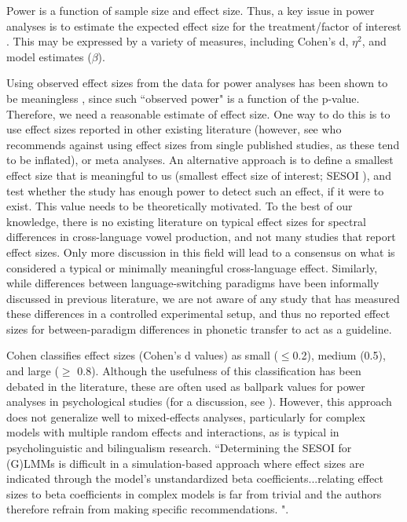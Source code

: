 \documentclass[12 pt]{article}
\begin{document}
Power is a function of sample size and effect size. Thus, a key issue in power analyses is to estimate the expected effect size for the treatment/factor of interest \citep{brysbaert2018power, kumle2021estimating}. This may be expressed by a variety of measures, including Cohen's d, $\eta ^2$, and model estimates ($\beta$). 

Using observed effect sizes from the data for power analyses has been shown to be meaningless \citep{hoenig2001abuse, gelman2019observed_effect_size}, since such ``observed power" is a function of the p-value. Therefore, we need a reasonable estimate of effect size. One way to do this is to use effect sizes reported in other existing literature (however, see \cite{brysbaert2018power} who recommends against using effect sizes from single published studies, as these tend to be inflated), or meta analyses. An alternative approach is to define a smallest effect size that is meaningful to us (smallest effect size of interest; SESOI \citep{kumle2021estimating}), and test whether the study has enough power to detect such an effect, if it were to exist. This value needs to be theoretically motivated. To the best of our knowledge, there is no existing literature on typical effect sizes for spectral differences in cross-language vowel production, and not many studies that report effect sizes. Only more discussion in this field will lead to a consensus on what is considered a typical or minimally meaningful cross-language effect. Similarly, while differences between language-switching paradigms have been informally discussed in previous literature, we are not aware of any study that has measured these differences in a controlled experimental setup, and thus no reported effect sizes for between-paradigm differences in phonetic transfer to act as a guideline. 

Cohen \citeyearpar{cohen1988statistical} classifies effect sizes (Cohen's d values) as small ($\leq$0.2), medium (0.5), and large ($\geq$ 0.8). Although the usefulness of this classification has been debated in the literature, these are often used as ballpark values for power analyses in psychological studies (for a discussion, see \cite{brysbaert2018power}). However, this approach does not generalize well to mixed-effects analyses, particularly for complex models with multiple random effects and interactions, as is typical in psycholinguistic and bilingualism research. ``Determining the SESOI for (G)LMMs is difficult in a simulation-based approach where effect sizes are indicated through the model’s unstandardized beta coefficients...relating effect sizes to beta coefficients in complex models is far from trivial and the authors therefore refrain from making specific recommendations. \citep{kumle2021estimating}". 
\end{document}
